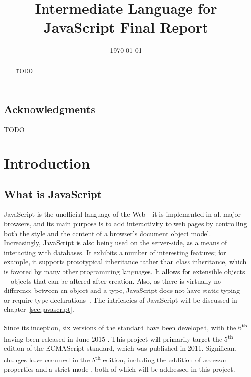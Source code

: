 \documentclass[a4paper,11pt,twoside]{report}
\title{Intermediate Language for JavaScript Final Report}
\date{\today}
\begin{document}


\clearpage{\pagestyle{empty}\cleardoublepage}
\setcounter{page}{1}
\pagestyle{fancy}

\begin{abstract}
TODO
\end{abstract}

\cleardoublepage
\section*{Acknowledgments}
TODO

\clearpage{\pagestyle{empty}\cleardoublepage}

\tableofcontents 


\clearpage{\pagestyle{empty}\cleardoublepage}
\setcounter{page}{1}
\fancyhead[LE,RO]{\slshape \rightmark}
\fancyhead[LO,RE]{\slshape \leftmark}

\chapter{Introduction}

\section{What is JavaScript}
JavaScript is the unofficial language of the Web---it is implemented in all major browsers, and its main purpose is to add interactivity to web pages by controlling both the style and the content of a browser's document object model. Increasingly, JavaScript is also being used on the server-side, as a means of interacting with databases. It exhibits a number of interesting features; for example, it supports prototypical inheritance rather than class inheritance, which is favored by many other programming languages. It allows for extensible objects---objects that can be altered after creation. Also, as there is virtually no difference between an object and a type, JavaScript does not have static typing or require type declarations~\cite{EcmaScript}. The intricacies of JavaScript will be discussed in chapter~\ref{sec:javascript}.

Since its inception, six versions of the standard have been developed, with the 6\textsuperscript{th} having been released in June 2015 \cite{international2015ecmascript}. This project will primarily target the 5\textsuperscript{th} edition of the ECMAScript standard, which was published in 2011. Significant changes have occurred in the 5\textsuperscript{th} edition, including the addition of accessor properties and a strict mode \cite{EcmaScript}, both of which will be addressed in this project.
\end{document}
